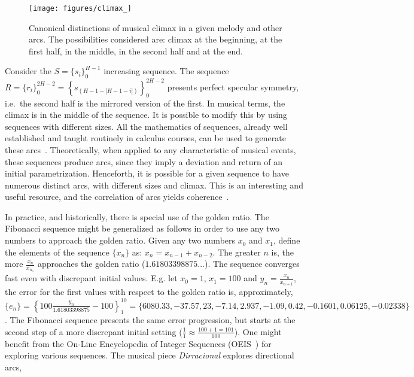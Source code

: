 \begin{figure}
    \centering
        \texttt{[image: figures/climax\_]}
        \caption{Canonical distinctions of musical climax in a given melody and
        other arcs. The possibilities considered are: climax at the beginning, at the first half, in the middle, in the second half and 
        at the end.}
        \label{fig:climax}
\end{figure}

Consider the $S=\{s_i\}_0^{H-1}$ increasing sequence. The sequence
$R=\{r_i\}_0^{2H -2}=\left\{s_{(H-1-|H-1-i|)}\right\}_0^{2H-2}$
presents perfect specular symmetry, i.e.\ the second half is the
mirrored version of the first. In musical terms, the climax is
in the middle of the sequence. It is possible to modify this
by using sequences with different sizes. All the mathematics of
sequences, already well established and taught routinely in calculus courses, can be used to generate these arcs~\cite{Guidorizzo,Schoenberg}.
Theoretically, when applied to any characteristic of musical events,
these sequences produce arcs, since they imply a deviation and return of an initial parametrization.
Henceforth, it is possible for a given sequence to have
numerous distinct arcs, with different sizes and climax. 
This is an interesting and useful resource, and the correlation of arcs yields coherence~\cite{Salzer}.

In practice, and historically, there is special use of the golden ratio.
The Fibonacci sequence might be generalized as follows in order to use any two numbers
to approach the golden ratio.
Given any two numbers $x_0$
and $x_1$, define the elements of the sequence $\{x_n\}$ as: $x_n=x_{n-1}+x_{n-2}$.
The greater $n$ is, the more $\frac{x_{n}}{x_{n_1}}$ approaches the golden ratio
($1.61803398875...$). The sequence converges fast even with discrepant
initial values.
E.g. let $x_0=1$, $x_1=100$ and $y_n=\frac{x_n}{x_{n+1}}$, the error for the first values with
respect to the golden ratio is, approximately, $\{ e_n \}
=\left\{100\frac{y_n}{1.61803398875}-100 \right\}_1^{10}=\{6080.33, -37.57, 23,
-7.14, 2.937, -1.09, 0.42, -0.1601, 0.06125, -0.02338\}$. The Fibonacci sequence
presents the same error progression, but starts at the second step of a more discrepant initial setting
($\frac{1}{1}\approx\frac{100+1 = 101}{100}$).
One might benefit from the On-Line Encyclopedia of Integer Sequences (OEIS~\cite{oeis})
for exploring various sequences.
The musical piece \emph{Dirracional} explores directional arcs,~\cite{MASSA}

